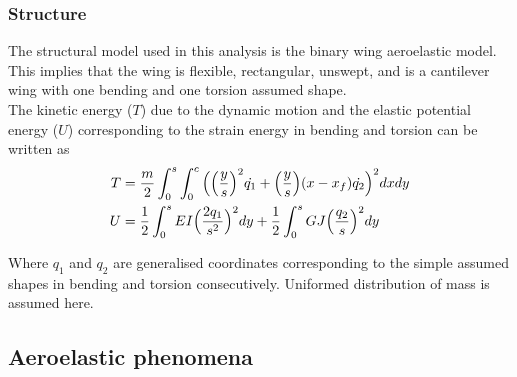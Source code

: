 \documentclass[11pt]{article}
\begin{document}
\subsubsection{Structure}
\label{sec:struc}
The structural model used in this analysis is the binary wing aeroelastic model. This implies that the wing is flexible, rectangular, unswept, and is a cantilever wing with one bending and one torsion assumed shape. \\

The kinetic energy ($T$) due to the dynamic motion and the elastic potential energy ($U$) corresponding to the strain energy in bending and torsion can be written as
\begin{align}
    T &= \frac{m}{2}\int_0^s \int_0^c \Big( \Big{(} \frac{y}{s}\Big{)}^2\dot{q_1}+\Big{(}\frac{y}{s}\Big{)}(x-x_f)\dot{q_2}\Big{)}^2dxdy\\
    U &= \frac{1}{2}\int_0^s EI \Big{(}\frac{2q_1}{s^2}\Big{)}^2dy+\frac{1}{2}\int_0^sGJ\Big{(}\frac{q_2}{s}\Big{)}^2dy
\end{align}

Where $q_1$ and $q_2$ are generalised coordinates corresponding to the simple assumed shapes in bending and torsion consecutively. Uniformed distribution of mass is assumed here. 


\subsection{Aeroelastic phenomena}
\label{sec:aero-phe}

\end{document}
